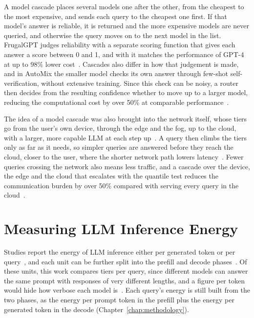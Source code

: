 \documentclass[cic,dipl,english]{infufrgs}
\begin{document}
A model cascade places several models one after the other, from the cheapest to the most
expensive, and sends each query to the cheapest one first. If that model's answer is
reliable, it is returned and the more expensive models are never queried, and otherwise
the query moves on to the next model in the list. FrugalGPT judges reliability with a separate scoring function that gives
each answer a score between 0 and 1, and with it matches the performance of GPT-4 at up
to 98\% lower cost~\cite{chen2024frugalgpt}. Cascades also differ in how that
judgement is made, and in AutoMix the smaller model checks its own answer through
few-shot self-verification, without extensive training. Since this check can be noisy, a router then decides from the
resulting confidence whether to move up to a larger model, reducing the computational
cost by over 50\% at comparable performance~\cite{aggarwal2023automix}.

The idea of a model cascade was also brought into the network itself, whose tiers go
from the user's own device, through the edge and the fog, up to the cloud, with a larger,
more capable LLM at each step up~\cite{pakpahan2026continuum}. A query then climbs the
tiers only as far as it needs, so simpler queries are answered before they reach the
cloud, closer to the user, where the shorter network path lowers
latency~\cite{chen2026network}. Fewer queries crossing the network also means less
traffic, and a cascade over the device, the edge and the cloud that escalates with the
quantile test reduces the communication burden by over 50\% compared with serving every
query in the cloud~\cite{wu2025recserve}.

\section{Measuring LLM Inference Energy}
\label{sec:metrics}
\label{sec:measurements}

Studies report the energy of LLM inference either per generated token or per
query~\cite{solovyeva2026green,elsworth2025measuring,chung2025mlenergy}, and each unit
can be further split into the prefill and decode phases~\cite{solovyeva2026green}. Of
these units, this work compares tiers per query, since different
models can answer the same prompt with responses of very different lengths, and a figure
per token would hide how verbose each model is~\cite{chung2025mlenergy}. Each query's
energy is still built from the two phases, as the energy per prompt token in the prefill
plus the energy per generated token in the decode (Chapter~\ref{chap:methodology}).
\end{document}
